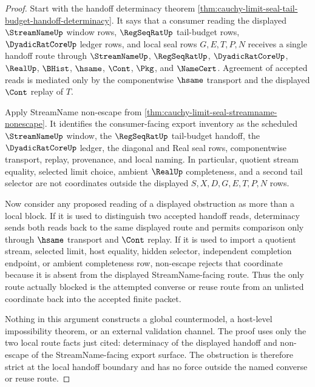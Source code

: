 \begin{proof}
Start with the handoff determinacy theorem \autoref{thm:cauchy-limit-seal-tail-budget-handoff-determinacy}. It says that a consumer reading the displayed $\StreamNameUp$ window rows, $\RegSeqRatUp$ tail-budget rows, $\DyadicRatCoreUp$ ledger rows, and local seal rows $G,E,T,P,N$ receives a single handoff route through $\StreamNameUp$, $\RegSeqRatUp$, $\DyadicRatCoreUp$, $\RealUp$, $\BHist$, $\hsame$, $\Cont$, $\Pkg$, and $\NameCert$. Agreement of accepted reads is mediated only by the componentwise $\hsame$ transport and the displayed $\Cont$ replay of $T$.

Apply StreamName non-escape from \autoref{thm:cauchy-limit-seal-streamname-nonescape}. It identifies the consumer-facing export inventory as the scheduled $\StreamNameUp$ window, the $\RegSeqRatUp$ tail-budget handoff, the $\DyadicRatCoreUp$ ledger, the diagonal and Real seal rows, componentwise transport, replay, provenance, and local naming. In particular, quotient stream equality, selected limit choice, ambient $\RealUp$ completeness, and a second tail selector are not coordinates outside the displayed $S,X,D,G,E,T,P,N$ rows.

Now consider any proposed reading of a displayed obstruction as more than a local block. If it is used to distinguish two accepted handoff reads, determinacy sends both reads back to the same displayed route and permits comparison only through $\hsame$ transport and $\Cont$ replay. If it is used to import a quotient stream, selected limit, host equality, hidden selector, independent completion endpoint, or ambient completeness row, non-escape rejects that coordinate because it is absent from the displayed StreamName-facing route. Thus the only route actually blocked is the attempted converse or reuse route from an unlisted coordinate back into the accepted finite packet.

Nothing in this argument constructs a global countermodel, a host-level impossibility theorem, or an external validation channel. The proof uses only the two local route facts just cited: determinacy of the displayed handoff and non-escape of the StreamName-facing export surface. The obstruction is therefore strict at the local handoff boundary and has no force outside the named converse or reuse route.
\end{proof}
